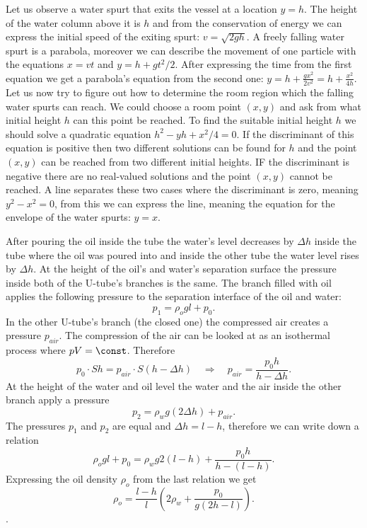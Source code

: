 \documentclass[11pt]{article}
\begin{document}

\solueng
Let us observe a water spurt that exits the vessel at a location $y=h$. The height of the water column above it is $h$ and from the conservation of energy we can express the initial speed of the exiting spurt: $v=\sqrt{2gh}$. A freely falling water spurt is a parabola, moreover we can describe the movement of one particle with the equations $x=vt$ and $y=h+gt^2/2$. After expressing the time from the first equation we get a parabola’s equation from the second one: $y = h + \frac{gx^2}{2v^2} = h + \frac{x^2}{4h}$. Let us now try to figure out how to determine the room region which the falling water spurts can reach. We could choose a room point $(x,y)$ and ask from what initial height $h$ can this point be reached. To find the suitable initial height $h$ we should solve a quadratic equation $h^2 - yh + x^2/4 = 0$. If the discriminant of this equation is positive then two different solutions can be found for $h$ and the point $(x,y)$ can be reached from two different initial heights. IF the discriminant is negative there are no real-valued solutions and the point $(x,y)$ cannot be reached. A line separates these two cases where the discriminant is zero, meaning $y^2 - x^2=0$, from this we can express the line, meaning the equation for the envelope of the water spurts: $y=x$.
\probend
\bigskip


\solueng
After pouring the oil inside the tube the water’s level decreases by $\Delta h$ inside the tube where the oil was poured into and inside the other tube the water level rises by $\Delta h$. At the height of the oil’s and water’s separation surface the pressure inside both of the U-tube’s branches is the same. The branch filled with oil applies the following pressure to the separation interface of the oil and water:
\[ p_1 = \rho_{o}gl + p_0.\]
In the other U-tube’s branch (the closed one) the compressed air creates a pressure $p_{air}$. The compression of the air can be looked at as an isothermal process where $pV = \const$. Therefore
\[ p_0\cdot Sh = p_{air}\cdot S(h-\Delta h) \quad\Rightarrow\quad p_{air} = \frac{p_0h}{h-\Delta h}.\]
At the height of the water and oil level the water and the air inside the other branch apply a pressure
\[ p_2 = \rho_wg(2\Delta h) + p_{air}.\]
The pressures $p_1$ and $p_2$ are equal and $\Delta h = l - h$, therefore we can write down a relation
\[ \rho_{o}gl + p_0 = \rho_wg2(l-h) + \frac{p_0h}{h-(l-h)}.\]
Expressing the oil density $\rho_{o}$ from the last relation we get
\[ \rho_{o} = \frac{l-h}{l}\left(2\rho_w+\frac{p_0}{g(2h-l)}\right).\].
\probend
\bigskip
\newpage
\end{document}
